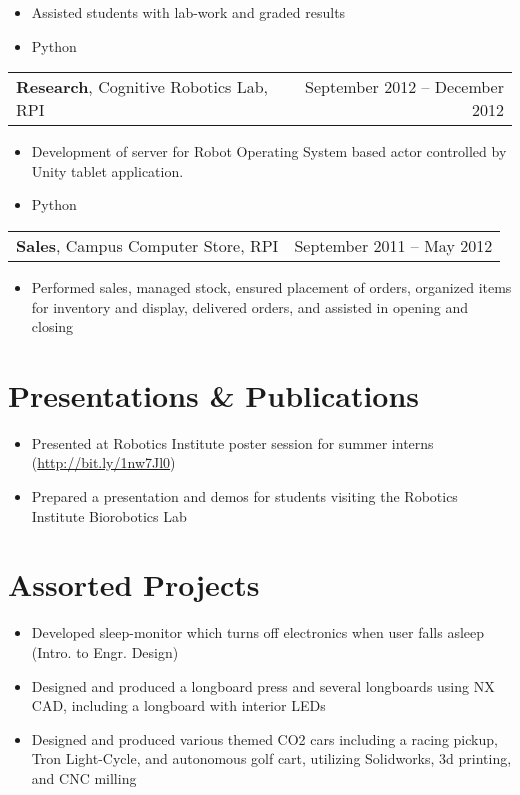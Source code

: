 \documentclass[margin]{res}
\begin{document}
\begin{resume}
\begin{itemize}
		\item Assisted students with lab-work and graded results
    \item Python
 	\end{itemize}
	\vspace{-1.5mm}
	\begin{tabular}{p{4in} r}
		{\bf Research}, Cognitive Robotics Lab, RPI		& September 2012 -- December 2012
	\end{tabular}
	\begin{itemize}
		\item Development of server for Robot Operating System based actor
			controlled by Unity tablet application.
    \item Python
	\end{itemize}
	\vspace{-1.5mm}
   \begin{tabular}{p{4in} r} %
   	{\bf Sales}, Campus Computer Store, RPI 				&  September 2011 -- May 2012\\
	\end{tabular}	
   \begin{itemize} %
   	\item Performed sales, managed stock, ensured placement of orders, organized items for
					inventory and display, delivered orders, and assisted in opening and closing
	\end{itemize}
\vspace{-1.5mm}
\normalsize{\section{Presentations \& Publications}}
\begin{itemize}
  \item Presented at Robotics Institute poster session for summer interns (\url{http://bit.ly/1nw7Jl0})
\item Prepared a presentation and demos for students visiting the Robotics Institute Biorobotics Lab
\end{itemize}

\normalsize{\section{Assorted Projects}}
\begin{itemize}
  \item Developed sleep-monitor which turns off electronics when user falls asleep (Intro. to Engr. Design)
  \item Designed and produced a longboard press and several longboards using NX CAD, including a longboard
        with interior LEDs
  \item Designed and produced various themed CO2 cars including a racing pickup, Tron Light-Cycle,
        and autonomous golf cart, utilizing Solidworks, 3d printing, and CNC milling
\end{itemize}
\vspace{-1.5mm}


\end{resume}
\end{document}
